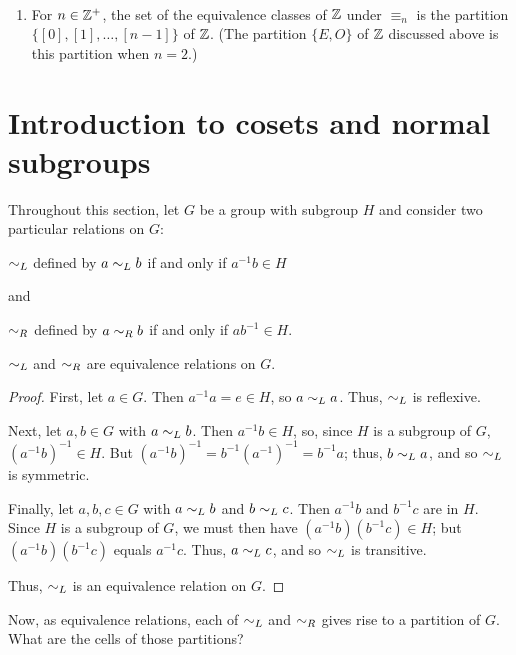 \begin{example}{}\
\begin{enumerate}\item For $n\in \mathbb{Z}^+$, the set of the equivalence classes of $\mathbb{Z}$ under $\equiv_n$ is
the partition $\{[0],[1],\ldots,[n-1]\}$ of $\mathbb{Z}$. (The
partition $\{E
,O\}$ of $\mathbb{Z}$ discussed above is this partition when
$n=2$.)
\end{enumerate}
\end{example}

\section{Introduction to cosets and normal subgroups}

Throughout this section, let $G$  be a group with subgroup $H$
and consider two particular relations on $G$:
\begin{center}$\sim_L$ defined by $a\sim_L b$ if and only if
$a^{-1}b\in H$\end{center} and
\begin{center}$\sim_R$ defined by $a\sim_R b$ if and only if
$ab^{-1}\in H$.\end{center}

\begin{thm}\label{simlreq} $\sim_L$ and $\sim_R$ are equivalence relations on $G$.
\end{thm}

\begin{proof}

First, let $a\in G$.  Then $a^{-1}a=e\in H$,
so $a\sim_L a$. Thus, $\sim_L$ is reflexive.

Next, let $a,b\in G$ with $a\sim_L b$.  Then
$a^{-1}b\in H$, so, since $H$ is a subgroup of $G$,
$(a^{-1}b)^{-1}\in H$.  But
$(a^{-1}b)^{-1}=b^{-1}(a^{-1})^{-1}=b^{-1}a$; thus, $b\sim_L a$, and so $\sim_L$ is symmetric.

Finally, let $a,b,c\in G$ with $a\sim_L b$
and $b\sim_L c$. Then $a^{-1}b$ and $b^{-1}c$ are in $H$.  Since
$H$ is a subgroup of $G$, we must then have
$(a^{-1}b)(b^{-1}c)\in H$; but $(a^{-1}b)(b^{-1}c)$ equals
 $a^{-1}c$. Thus, $a\sim_L c$, and so $\sim_L$ is transitive.

 Thus, $\sim_L$ is an equivalence relation on $G$.  \end{proof}

 Now, as equivalence relations, each of $\sim_L$ and $\sim_R$
gives rise to a partition of $G$.  What are the cells of those
partitions?

